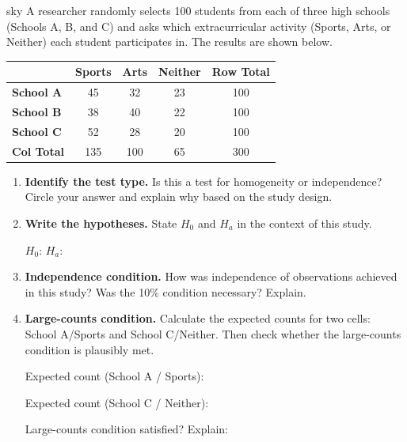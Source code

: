 \documentclass[10pt]{article}
\begin{document}
\namepartnerperiod

\vspace{0.08in}

\begin{scenariobox}{sky}
A researcher randomly selects 100 students from each of three high schools (Schools A, B, and C)
and asks which extracurricular activity (Sports, Arts, or Neither) each student participates in.
The results are shown below.

\vspace{0.08in}
\renewcommand{\arraystretch}{1.4}
\begin{tabularx}{0.82\linewidth}{l cccc}
    & \textbf{Sports} & \textbf{Arts} & \textbf{Neither} & \textbf{Row Total} \\
    \hline
    \textbf{School A} & 45 & 32 & 23 & 100 \\
    \textbf{School B} & 38 & 40 & 22 & 100 \\
    \textbf{School C} & 52 & 28 & 20 & 100 \\
    \hline
    \textbf{Col Total} & 135 & 100 & 65 & 300 \\
\end{tabularx}
\end{scenariobox}

\begin{enumerate}[label=\textbf{A\arabic*.}]

    \item \textbf{Identify the test type.} Is this a test for homogeneity or independence?
          Circle your answer and explain why based on the study design.

    \item \textbf{Write the hypotheses.} State $H_0$ and $H_a$ in the context of this study.

          $H_0$: \writeline
          $H_a$: \writeline

    \item \textbf{Independence condition.} How was independence of observations achieved
          in this study? Was the 10\% condition necessary? Explain.

    \item \textbf{Large-counts condition.} Calculate the expected counts for two cells:
          School A/Sports and School C/Neither. Then check whether the large-counts
          condition is plausibly met.

          Expected count (School A / Sports): \blank{5cm}

          Expected count (School C / Neither): \blank{5cm}

          Large-counts condition satisfied? \blank{2cm} \quad Explain: \writeline

\end{enumerate}
\end{document}
